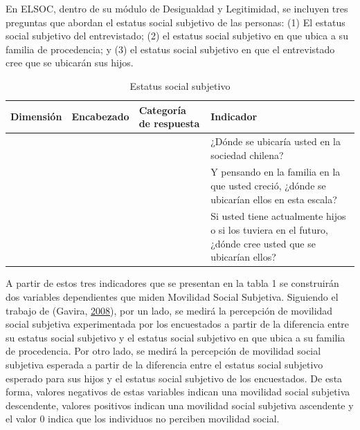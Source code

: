 \documentclass[
]{article}
\begin{document}
En ELSOC, dentro de su módulo de Desigualdad y Legitimidad, se incluyen
tres preguntas que abordan el estatus social subjetivo de las personas:
(1) El estatus social subjetivo del entrevistado; (2) el estatus social
subjetivo en que ubica a su familia de procedencia; y (3) el estatus
social subjetivo en que el entrevistado cree que se ubicarán sus hijos.

\begin{table}[!h]

\caption{\label{tab:unnamed-chunk-3}Estatus social subjetivo}
\centering
\fontsize{8}{10}\selectfont
\begin{tabu} to 
\toprule
Dimensión & Encabezado & Categoría de respuesta & Indicador\\
\midrule
 &  &  & ¿Dónde se ubicaría usted en la sociedad chilena?\\
 &  &  & Y pensando en la familia en la que usted creció, ¿dónde se ubicarían ellos en esta escala?\\
 &  &  & Si usted tiene actualmente hijos o si los tuviera en el futuro, ¿dónde cree usted que se ubicarían ellos?\\
\bottomrule
\end{tabu}
\end{table}

A partir de estos tres indicadores que se presentan en la tabla 1 se
construirán dos variables dependientes que miden Movilidad Social
Subjetiva. Siguiendo el trabajo de (Gavira,
\protect\hyperlink{ref-gavira_Social_2008}{2008}), por un lado, se
medirá la percepción de movilidad social subjetiva experimentada por los
encuestados a partir de la diferencia entre su estatus social subjetivo
y el estatus social subjetivo en que ubica a su familia de procedencia.
Por otro lado, se medirá la percepción de movilidad social subjetiva
esperada a partir de la diferencia entre el estatus social subjetivo
esperado para sus hijos y el estatus social subjetivo de los
encuestados. De esta forma, valores negativos de estas variables indican
una movilidad social subjetiva descendente, valores positivos indican
una movilidad social subjetiva ascendente y el valor 0 indica que los
individuos no perciben movilidad social.
\end{document}
